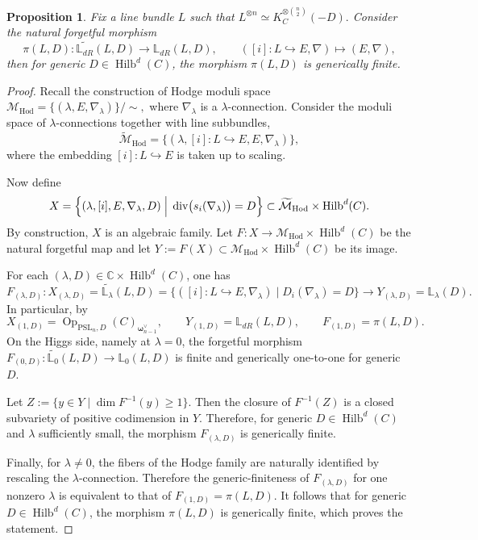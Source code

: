 \documentclass[twoside, 11pt]{article}
\numberwithin{equation}{section}
\theoremstyle{theorem}
\numberwithin{theorem}{section}
\newtheorem{proposition}[proposition]{Proposition}
\theoremstyle{definition}
\begin{document}
\begin{proposition}\label{p: generic finite dR}
Fix a line bundle \(L\) such that
\(
L^{\otimes n}\simeq K_C^{\otimes \binom{n}{2}}(-D).
\)
Consider the natural forgetful morphism
\[
\pi(L,D)\colon
\widetilde{\mathbb{L}_{dR}}(L,D)
\longrightarrow
\mathbb{L}_{dR}(L,D),
\qquad
([i]\colon L\hookrightarrow E,\nabla)\longmapsto (E,\nabla),
\]
then for generic \(D\in \operatorname{Hilb}^d(C)\), the morphism \(\pi(L,D)\) is generically finite.
\end{proposition}

\begin{proof}
Recall the construction of Hodge moduli space
\(
\mathcal{M}_{\mathrm{Hod}}
=
\{(\lambda,E,\nabla_\lambda)\}/\!\sim,
\)
where \(\nabla_\lambda\) is a \(\lambda\)-connection. Consider the  moduli space of $\lambda$-connections together with line subbundles,
\[
\widetilde{\mathcal{M}}_{\mathrm{Hod}}
=
\bigl\{
(\lambda,[i]\colon L\hookrightarrow E,E,\nabla_\lambda)
\bigr\},
\]
where the embedding \([i]\colon L\hookrightarrow E\) is taken up to scaling.

Now define
\[
X =\Bigl\{
(\lambda,[i],E,\nabla_\lambda,D)
\;\Big|\;
\operatorname{div}\bigl(s_i(\nabla_\lambda)\bigr)=D
\Bigr\}\subset \widetilde{\mathcal{M}}_{\mathrm{Hod}}\times \operatorname{Hilb}^d(C).
\]
By construction, \(X\) is an algebraic family. Let
\(
F\colon X\to \mathcal{M}_{\mathrm{Hod}}\times \operatorname{Hilb}^d(C)
\)
be the natural forgetful map
and let
\(
Y:=F(X)\subset \mathcal{M}_{\mathrm{Hod}}\times \operatorname{Hilb}^d(C)
\)
be its image.

For each \((\lambda,D)\in \mathbb{C}\times \operatorname{Hilb}^d(C)\), one has
\[
F_{(\lambda,D)}\colon
X_{(\lambda,D)}= \widetilde{\mathbb{L}_{\lambda}}(L,D) = 
\bigl\{
([i]\colon L\hookrightarrow E,\nabla_\lambda)
\mid
D_i(\nabla_\lambda)=D
\bigr \}
\longrightarrow
Y_{(\lambda,D)}=\mathbb{L}_{\lambda}(D).
\]
In particular, by 
\[
X_{(1,D)}
=
\operatorname{Op}_{\mathrm{PSL}_n,D}(C)_{\boldsymbol{\omega}_{n-1}^{\vee}},
\qquad
Y_{(1,D)}
=
\mathbb{L}_{dR}(L,D),
\qquad
F_{(1,D)}=\pi(L,D).
\]
On the Higgs side, namely at \(\lambda=0\), the forgetful morphism
\(
F_{(0,D)}\colon \widetilde{\mathbb{L}_{0}}(L,D) \to \mathbb{L}_0(L,D)
\)
is finite and generically one-to-one for generic \(D\).

Let
\(
Z
:=
\bigl\{
y\in Y \mid \dim F^{-1}(y)\ge 1
\bigr\}.
\)
Then the closure of \(F^{-1}(Z)\) is a closed subvariety of positive codimension in \(Y\). Therefore, for generic $D \in \operatorname{Hilb}^d(C)$ and $\lambda$ sufficiently small, the morphism
\(
F_{(\lambda,D)}
\)
is generically finite.

Finally, for \(\lambda\neq 0\), the fibers of the Hodge family are naturally identified by rescaling the
\(\lambda\)-connection. Therefore the generic-finiteness of \(F_{(\lambda,D)}\) for one nonzero \(\lambda\)
is equivalent to that of \(F_{(1,D)}=\pi(L,D)\). It follows that for generic \(D\in \operatorname{Hilb}^d(C)\), the morphism $\pi(L,D)$
is generically finite, which proves the statement.
\end{proof}
\end{document}
